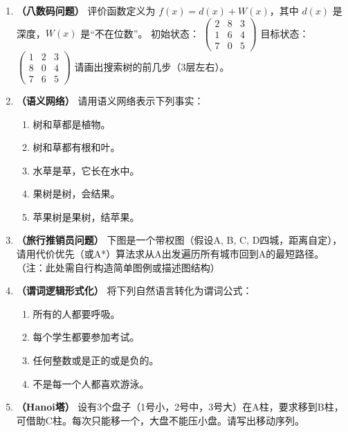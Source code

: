 \begin{enumerate}[leftmargin=2em,itemsep=1em]
\item \textbf{（八数码问题）} 评价函数定义为 $f(x) = d(x) + W(x)$，其中 $d(x)$ 是深度，$W(x)$ 是“不在位数”。
初始状态：
$
\begin{pmatrix}
2 & 8 & 3 \\
1 & 6 & 4 \\
7 & 0 & 5
\end{pmatrix}
$
目标状态：
$
\begin{pmatrix}
1 & 2 & 3 \\
8 & 0 & 4 \\
7 & 6 & 5
\end{pmatrix}
$
请画出搜索树的前几步（3层左右）。

\item \textbf{（语义网络）} 请用语义网络表示下列事实：
\begin{enumerate}
    \item 树和草都是植物。
    \item 树和草都有根和叶。
    \item 水草是草，它长在水中。
    \item 果树是树，会结果。
    \item 苹果树是果树，结苹果。
\end{enumerate}

\item \textbf{（旅行推销员问题）} 下图是一个带权图（假设A, B, C, D四城，距离自定），请用代价优先（或A*）算法求从A出发遍历所有城市回到A的最短路径。
（注：此处需自行构造简单图例或描述图结构）

\item \textbf{（谓词逻辑形式化）} 将下列自然语言转化为谓词公式：
\begin{enumerate}
    \item 所有的人都要呼吸。
    \item 每个学生都要参加考试。
    \item 任何整数或是正的或是负的。
    \item 不是每一个人都喜欢游泳。
\end{enumerate}

\item \textbf{（Hanoi塔）} 设有3个盘子（1号小，2号中，3号大）在A柱，要求移到B柱，可借助C柱。每次只能移一个，大盘不能压小盘。请写出移动序列。

\end{enumerate}

